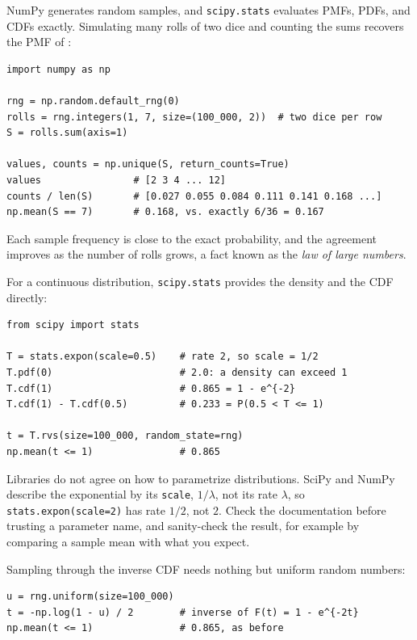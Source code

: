 NumPy generates random samples, and \texttt{scipy.stats} evaluates
PMFs, PDFs, and CDFs exactly. Simulating many rolls of two dice and
counting the sums recovers the PMF of :

\begin{lstlisting}
import numpy as np

rng = np.random.default_rng(0)
rolls = rng.integers(1, 7, size=(100_000, 2))  # two dice per row
S = rolls.sum(axis=1)

values, counts = np.unique(S, return_counts=True)
values                # [2 3 4 ... 12]
counts / len(S)       # [0.027 0.055 0.084 0.111 0.141 0.168 ...]
np.mean(S == 7)       # 0.168, vs. exactly 6/36 = 0.167
\end{lstlisting}

Each sample frequency is close to the exact probability, and the
agreement improves as the number of rolls grows, a fact known as the
\emph{law of large numbers}.

For a continuous distribution, \texttt{scipy.stats} provides the density
and the CDF directly:

\begin{lstlisting}
from scipy import stats

T = stats.expon(scale=0.5)    # rate 2, so scale = 1/2
T.pdf(0)                      # 2.0: a density can exceed 1
T.cdf(1)                      # 0.865 = 1 - e^{-2}
T.cdf(1) - T.cdf(0.5)         # 0.233 = P(0.5 < T <= 1)

t = T.rvs(size=100_000, random_state=rng)
np.mean(t <= 1)               # 0.865
\end{lstlisting}

\begin{warning}
  Libraries do not agree on how to parametrize distributions. SciPy and
  NumPy describe the exponential by its \texttt{scale}, $1/\lambda$, not
  its rate $\lambda$, so \texttt{stats.expon(scale=2)} has rate $1/2$,
  not $2$. Check the documentation before trusting a parameter name,
  and sanity-check the result, for example by comparing a sample mean
  with what you expect.
\end{warning}

Sampling through the inverse CDF needs nothing but uniform random
numbers:

\begin{lstlisting}
u = rng.uniform(size=100_000)
t = -np.log(1 - u) / 2        # inverse of F(t) = 1 - e^{-2t}
np.mean(t <= 1)               # 0.865, as before
\end{lstlisting}

